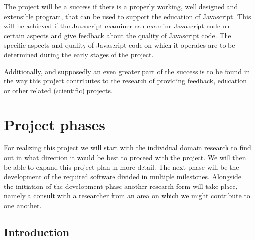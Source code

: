 \documentclass{article}
\begin{document}
\begin{itemize}
The project will be a success if there is a properly working, well designed and extensible program, that can be used to support the education of Javascript. This will be achieved if the Javascript examiner can examine Javascript code on certain aspects and give feedback about the quality of Javascript code. The specific aspects and quality of Javascript code on which it operates are to be determined during the early stages of the project.

Additionally, and supposedly an even greater part of the success is to be found in the way this project contributes to the research of providing feedback, education or other related (scientific) projects.

\section{Project phases}


For realizing this project we will start with the individual domain research to find out in what direction it would be best to proceed with the project. We will then be able to expand this project plan in more detail. The next phase will be the development of the required software divided in multiple milestones. Alongside the initiation of the development phase another research form will take place, namely a consult with a researcher from an area on which we might contribute to one another.

\subsection{Introduction}



\end{itemize}
\end{document}
